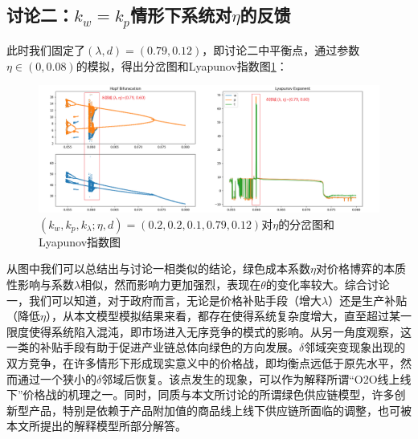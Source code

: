 \documentclass{article}
\begin{document}
\subsection{讨论二：$k_w=k_p$情形下系统对$\eta$的反馈}
\par 此时我们固定了$(\lambda,d)=(0.79,0.12)$，即讨论二中平衡点，通过参数$\eta\in(0,0.08)$的模拟，得出分岔图和Lyapunov指数图\ref{Hopf_Lyapunov_2_1}：
\begin{figure}[H]
    \centering
    \includegraphics[width=16.5cm]{Hopf_Lyapunov_2_1.png}
    \caption{$(k_w,k_p,k_\lambda;\eta,d)=(0.2,0.2,0.1,0.79,0.12)$对$\eta$的分岔图和Lyapunov指数图}
    \label{Hopf_Lyapunov_2_1}
\end{figure}
\par 从图中我们可以总结出与讨论一相类似的结论，绿色成本系数$\eta$对价格博弈的本质性影响与系数$\lambda$相似，然而影响力更加强烈，表现在$\theta$的变化率较大。综合讨论一，我们可以知道，对于政府而言，无论是价格补贴手段（增大$\lambda$）还是生产补贴（降低$\eta$），从本文模型模拟结果来看，都存在使得系统复杂度增大，直至超过某一限度使得系统陷入混沌，即市场进入无序竞争的模式的影响。从另一角度观察，这一类的补贴手段有助于促进产业链总体向绿色的方向发展。$\delta$邻域突变现象出现的双方竞争，在许多情形下形成现实意义中的价格战，即均衡点远低于原先水平，然而通过一个狭小的$\delta$邻域后恢复。该点发生的现象，可以作为解释所谓“O2O线上线下”价格战的机理之一。同时，同质与本文所讨论的所谓绿色供应链模型，许多创新型产品，特别是依赖于产品附加值的商品线上线下供应链所面临的调整，也可被本文所提出的解释模型所部分解答。
\end{document}

